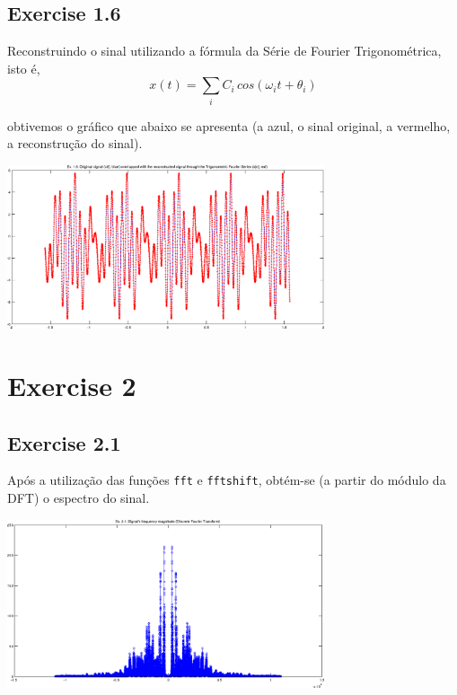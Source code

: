 \documentclass[a4paper]{article}
\begin{document}
\clearpage

\subsection{Exercise 1.6}
\noindent Reconstruindo o sinal utilizando a fórmula da Série de Fourier Trigonométrica, isto é,
\begin{equation}
	x(t) = \sum_{i} C_{i} \, cos(\omega_{i} t + \theta_{i})
\end{equation}

\noindent obtivemos o gráfico que abaixo se apresenta (a azul, o sinal original, a vermelho, a reconstrução do sinal).
\begin{center}
	\includegraphics[width=0.70\textwidth]{images/ex_1_6.png}
	\label{fig:ex_1_6}
\end{center}

\clearpage
\section{Exercise 2}
\subsection{Exercise 2.1}
\noindent Após a utilização das funções \texttt{fft} e \texttt{fftshift}, obtém-se (a partir do módulo da DFT) o espectro do sinal.
\begin{center}
	\includegraphics[width=0.70\textwidth]{images/ex_2_1.png}
	\label{fig:ex_2_1}
\end{center}
\end{document}
